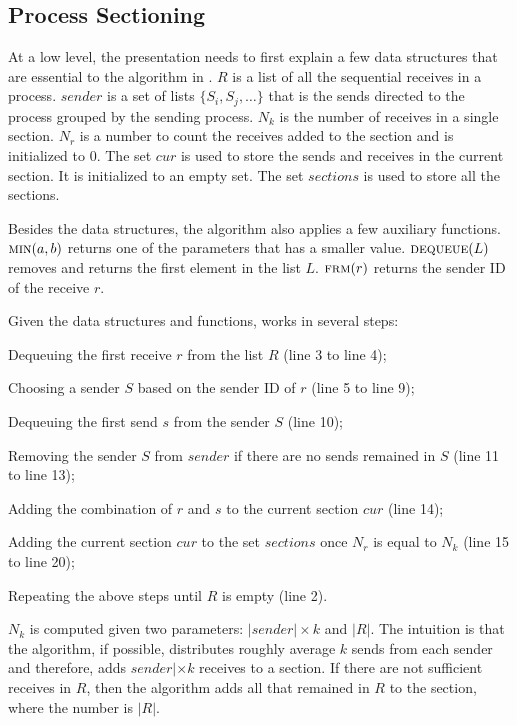 \subsection{Process Sectioning}

At a low level, the presentation needs to first explain a few data structures that are essential to the algorithm in .
$R$ is a list of all the sequential receives in a process.
$\mathit{sender}$ is a set of lists $\{S_i, S_j, \ldots\}$ that is the sends directed to the process grouped by the sending process.
$N_k$ is the number of receives in a single section.
$N_r$ is a number to count the receives added to the section and is initialized to $0$.
The set $\mathit{cur}$ is used to store the sends and receives in the current section. It is initialized to an empty set.
The set $\mathit{sections}$ is used to store all the sections.

Besides the data structures, the algorithm also applies a few auxiliary functions. 
$\Call{min}{a,b}$ returns one of the parameters that has a smaller value. 
$\Call{dequeue}{L}$ removes and returns the first element in the list $L$.
$\Call{frm}{r}$ returns the sender ID of the receive $r$.

Given the data structures and functions,  works in several steps: 
\begin{compactenum}
\item Dequeuing the first receive $r$ from the list $R$ (line 3 to line 4);
\item Choosing a sender $S$ based on the sender ID of $r$ (line 5 to line 9);
\item Dequeuing the first send $s$ from the sender $S$ (line 10);
\item Removing the sender $S$ from $\mathit{sender}$ if there are no sends remained in $S$ (line 11 to line 13);
\item Adding the combination of $r$ and $s$ to the current section $\mathit{cur}$ (line 14);
\item Adding the current section $\mathit{cur}$ to the set $\mathit{sections}$ once $N_r$ is equal to $N_k$ (line 15 to line 20);
\item Repeating the above steps until $R$ is empty (line 2).
\end{compactenum}


$N_k$ is computed given two parameters: $|\mathit{sender}|\times\mathit{k}$ and $|R|$. The intuition is that the algorithm, if possible, distributes roughly average $k$ sends from each sender and therefore, adds $\mathit{sender}|\times\mathit{k}$ receives to a section. If there are not sufficient receives in $R$, then the algorithm adds all that remained in $R$ to the section, where the number is $|R|$. 

